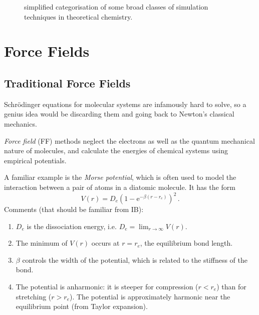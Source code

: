 \documentclass{article}
\theoremstyle{plain}\theoremheaderfont{\normalfont\itshape}\theorembodyfont{\rmfamily}\theoremseparator{.}\newtheorem*{rem}{Remark}\newtheorem*{ex}{Example}\newtheorem*{proof}{Proof}\newtheorem*{altp}{Alternative proof}
\theoremstyle{plain}\theoremheaderfont{\normalfont\bfseries}\theorembodyfont{\rmfamily}\theoremseparator{.}\newtheorem{thm}{Theorem}[section]\newtheorem{lem}[thm]{Lemma}\newtheorem{prop}[thm]{Proposition}\newtheorem*{cor}{Corollary}\newtheorem{defn}[thm]{Definition}\newtheorem{clm}[thm]{Claim}\newtheorem{clminproof}{Claim}\newtheorem{pos}{Postulate}[section]
\theoremstyle{break}\theoremheaderfont{\normalfont\itshape}\theorembodyfont{\rmfamily}\theoremseparator{.\medskip}\newtheorem*{proofskip}{Proof}\newtheorem*{exs}{Examples}\newtheorem*{rems}{Remarks}
\theoremstyle{break}\theoremheaderfont{\normalfont\bfseries}\theorembodyfont{\rmfamily}\theoremseparator{.\medskip}\newtheorem{lemskip}[thm]{Lemma}\newtheorem{defnskip}[thm]{Definition}\newtheorem{propskip}[thm]{Proposition}\newtheorem{thmskip}[thm]{Theorem}
\numberwithin{equation}{section}
\newcommand{\ee}{\mathrm{e}}
\begin{document}
    \begin{figure}
        \centering
        \caption{simplified categorisation of some broad classes of simulation techniques in theoretical chemistry.}
    \end{figure}

    \section{Force Fields}
    \subsection{Traditional Force Fields}
    Schr\"{o}dinger equations for molecular systems are infamously hard to solve, so a genius idea would be discarding them and going back to Newton's classical mechanics.

    \textit{Force field} (FF) methods neglect the electrons as well as the quantum mechanical nature of molecules, and calculate the energies of chemical systems using empirical potentials.

    A familiar example is the \textit{Morse potential}, which is often used to model the interaction
    between a pair of atoms in a diatomic molecule. It has the form
    \begin{equation}
        V(r)=D_e\left(1-\ee^{-\beta(r-r_e)}\right)^2\,.
    \end{equation}
    Comments (that should be familiar from IB):
    \begin{enumerate}[topsep=0pt,label=(\roman*)]
        \item \(D_e\) is the dissociation energy, i.e. \(D_e=\lim_{r\to\infty}V(r)\).
        \item The minimum of \(V(r)\) occurs at \(r=r_e\), the equilibrium bond length.
        \item \(\beta\) controls the width of the potential, which is related to the stiffness of the bond.
        \item The potential is anharmonic: it is steeper for compression (\(r<r_e\)) than for stretching (\(r>r_e\)). The potential is approximately harmonic near the equilibrium point (from Taylor expansion).
    \end{enumerate}
\end{document}
